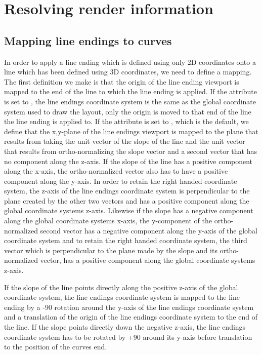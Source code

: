 
\section{Resolving render information}
\label{apdx-mappings}

\subsection{Mapping line endings to curves}
\label{mapping}

In order to apply a line ending which is defined using only 2D coordinates onto a line which
has been defined using 3D coordinates, we need to define a mapping.
The first definition we make is that the origin of the line ending viewport is
mapped to the end of the line to which the line ending is applied.
If the  attribute is set to , the
line endings coordinate system is the same as the global coordinate system used to draw the layout,
only the origin is moved to that end of the line the line ending is applied to. If
the  attribute is set to , which is
the default, we define that the x,y-plane of the line endings viewport is mapped to the
plane that results from taking the unit vector of the slope of the line and the unit
vector that results from ortho-normalizing the slope vector and a second vector
that has no component along the z-axis. If the slope of the line has a positive component along the x-axis,
the ortho-normalized vector also has to have a positive component along the y-axis. In order to retain the
right handed coordinate system, the z-axis of the line endings coordinate system is perpendicular to the plane created by the other two vectors and has a positive component along the global coordinate systems z-axis.
Likewise if the slope has a negative component along the global coordinate systems x-axis, the y-component of the
ortho-normalized second vector has a negative component along the y-axis of the global coordinate system and to 
retain the right handed coordinate system, the third vector which is perpendicular to the plane made by the slope
and its ortho-normalized vector, has a positive component along the global coordinate systems z-axis. 

If the slope of the line points directly along the positive z-axis of the global coordinate system, the 
line endings coordinate system is mapped to the line ending by a -90 rotation around the y-axis of the 
line endings coordinate system and a translation of the origin of the line endings coordinate system to 
the end of the line. If the slope points directly down the negative z-axis, the line endings coordinate 
system has to be rotated by +90 around its y-axis before translation to the position of the curves end.   


